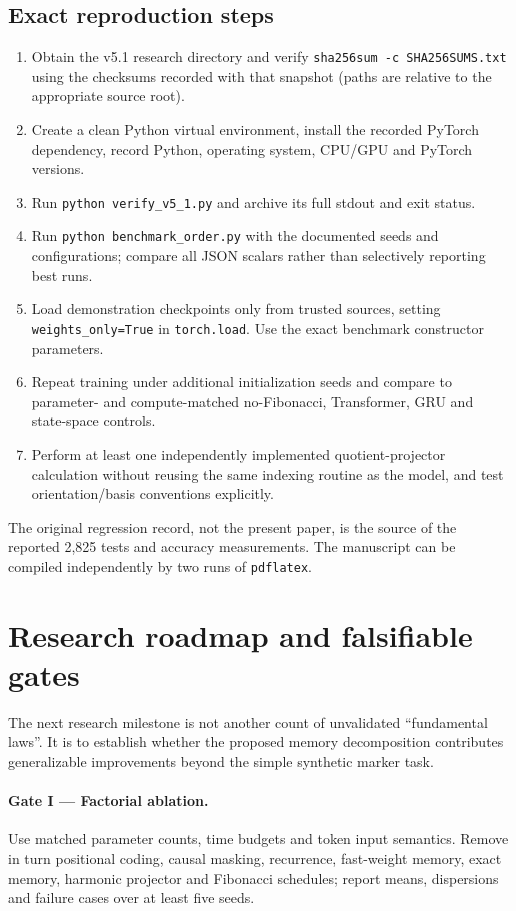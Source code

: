 \documentclass[11pt,a4paper]{article}
\theoremstyle{plain}\newtheorem{theorem}{Theorem}[section]\newtheorem{proposition}[theorem]{Proposition}\newtheorem{lemma}[theorem]{Lemma}
\theoremstyle{definition}\newtheorem{definition}[theorem]{Definition}\newtheorem{remark}[theorem]{Remark}\newtheorem{counterexample}[theorem]{Counterexample}
\begin{document}
\subsection{Exact reproduction steps}
\begin{enumerate}[leftmargin=*]
\item Obtain the v5.1 research directory and verify \verb|sha256sum -c SHA256SUMS.txt| using the checksums recorded with that snapshot (paths are relative to the appropriate source root).
\item Create a clean Python virtual environment, install the recorded PyTorch dependency, record Python, operating system, CPU/GPU and PyTorch versions.
\item Run \verb|python verify_v5_1.py| and archive its full stdout and exit status.
\item Run \verb|python benchmark_order.py| with the documented seeds and configurations; compare all JSON scalars rather than selectively reporting best runs.
\item Load demonstration checkpoints only from trusted sources, setting \texttt{weights\_only=True} in \texttt{torch.load}. Use the exact benchmark constructor parameters.
\item Repeat training under additional initialization seeds and compare to parameter- and compute-matched no-Fibonacci, Transformer, GRU and state-space controls.
\item Perform at least one independently implemented quotient-projector calculation without reusing the same indexing routine as the model, and test orientation/basis conventions explicitly.
\end{enumerate}
The original regression record, not the present paper, is the source of the reported 2,825 tests and accuracy measurements. The manuscript can be compiled independently by two runs of \verb|pdflatex|.

\section{Research roadmap and falsifiable gates}
The next research milestone is not another count of unvalidated ``fundamental laws''. It is to establish whether the proposed memory decomposition contributes generalizable improvements beyond the simple synthetic marker task.
\paragraph{Gate I --- Factorial ablation.} Use matched parameter counts, time budgets and token input semantics. Remove in turn positional coding, causal masking, recurrence, fast-weight memory, exact memory, harmonic projector and Fibonacci schedules; report means, dispersions and failure cases over at least five seeds.
\end{document}
